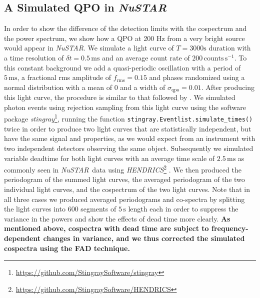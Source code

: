 \documentclass[12pt]{emulateapj}
\newcommand{\project}[1]{\textsl{#1}}
\newcommand{\nustar}{\project{NuSTAR}\xspace}
\begin{document}





\subsection{A Simulated QPO in \nustar}

In order to show the difference of the detection limits with the cospectrum and the power spectrum, we show how a QPO at 200 Hz from a very bright source would appear in \nustar. 
We simulate a light curve of $T=3000\mathrm{s}$ duration with a time resolution of $\delta t = 0.5 \,\mathrm{ms}$ and an average count rate of $200 \,\mathrm{counts}\,\mathrm{s}^{-1}$. To this constant background we add a quasi-periodic oscillation with a period of $5\,\mathrm{ms}$, a fractional rms amplitude of $f_\mathrm{rms} = 0.15$ and phases randomized using a normal distribution with a mean of $0$ and a width of $\sigma_\mathrm{qpo} = 0.01$. After producing this light curve, the procedure is similar to that followed by \citet{Bachetti+15}. We simulated photon events using rejection sampling from this light curve using the software package \textit{stingray}\footnote{\url{https://github.com/StingraySoftware/stingray}}, running the function \texttt{stingray.Eventlist.simulate\_times()} twice in order to produce two light curves that are statistically independent, but have the same signal and properties, as we would expect from an instrument with two independent detectors observing the same object. Subsequently we simulated variable deadtime for both light curves with an average time scale of $2.5 \,\mathrm{ms}$ as commonly seen in \nustar\ data \citep{Bachetti+15} using \textit{HENDRICS}\footnote{\url{https://github.com/StingraySoftware/HENDRICS}} \citep{bachetti2015b}. We then produced the periodogram of the summed light curves, the averaged periodogram of the two individual light curves, and the cospectrum of the two light curves. Note that in all three cases we produced averaged periodograms and co-spectra by splitting the light curves into 600 segments of $5\,\mathrm{s}$ length each in order to suppress the variance in the powers and show the effects of dead time more clearly. \textbf{As mentioned above, cospectra with dead time are subject to frequency-dependent changes in variance, and we thus corrected the simulated cospectra using the FAD technique.}
\end{document}
